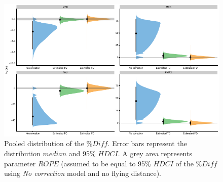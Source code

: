 \documentclass[fleqn,10pt]{wlpeerj} %
\begin{document}
\begin{figure}

{\centering \includegraphics[width=0.9\linewidth]{shorts-simulation-paper_files/figure-latex/graph-ROPE-pooled-1} 

}

\caption{Pooled distribution of the \(\%Diff\). Error bars represent the distribution \(median\) and 95\% \(HDCI\). A grey area represents parameter \(ROPE\) (assumed to be equal to 95\% \(HDCI\) of the \(\%Diff\) using \emph{No correction} model and no flying distance).}\label{fig:graph-ROPE-pooled}
\end{figure}
\end{document}

